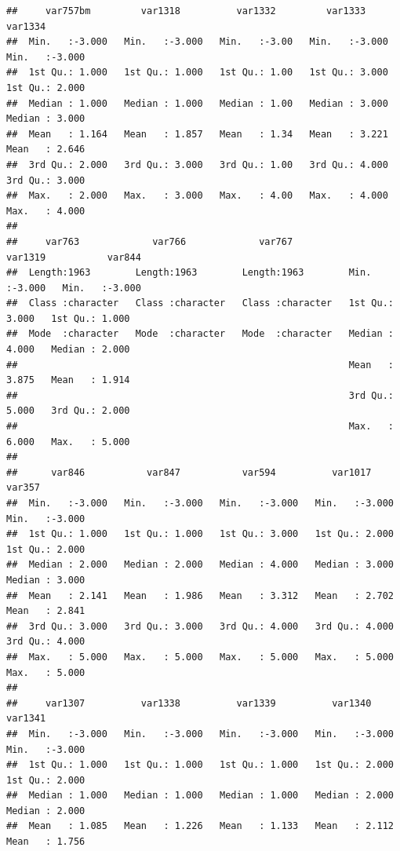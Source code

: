 \documentclass[
]{book}
\begin{document}
\begin{verbatim}
##     var757bm         var1318          var1332         var1333          var1334      
##  Min.   :-3.000   Min.   :-3.000   Min.   :-3.00   Min.   :-3.000   Min.   :-3.000  
##  1st Qu.: 1.000   1st Qu.: 1.000   1st Qu.: 1.00   1st Qu.: 3.000   1st Qu.: 2.000  
##  Median : 1.000   Median : 1.000   Median : 1.00   Median : 3.000   Median : 3.000  
##  Mean   : 1.164   Mean   : 1.857   Mean   : 1.34   Mean   : 3.221   Mean   : 2.646  
##  3rd Qu.: 2.000   3rd Qu.: 3.000   3rd Qu.: 1.00   3rd Qu.: 4.000   3rd Qu.: 3.000  
##  Max.   : 2.000   Max.   : 3.000   Max.   : 4.00   Max.   : 4.000   Max.   : 4.000  
##                                                                                     
##     var763             var766             var767             var1319           var844      
##  Length:1963        Length:1963        Length:1963        Min.   :-3.000   Min.   :-3.000  
##  Class :character   Class :character   Class :character   1st Qu.: 3.000   1st Qu.: 1.000  
##  Mode  :character   Mode  :character   Mode  :character   Median : 4.000   Median : 2.000  
##                                                           Mean   : 3.875   Mean   : 1.914  
##                                                           3rd Qu.: 5.000   3rd Qu.: 2.000  
##                                                           Max.   : 6.000   Max.   : 5.000  
##                                                                                            
##      var846           var847           var594          var1017           var357      
##  Min.   :-3.000   Min.   :-3.000   Min.   :-3.000   Min.   :-3.000   Min.   :-3.000  
##  1st Qu.: 1.000   1st Qu.: 1.000   1st Qu.: 3.000   1st Qu.: 2.000   1st Qu.: 2.000  
##  Median : 2.000   Median : 2.000   Median : 4.000   Median : 3.000   Median : 3.000  
##  Mean   : 2.141   Mean   : 1.986   Mean   : 3.312   Mean   : 2.702   Mean   : 2.841  
##  3rd Qu.: 3.000   3rd Qu.: 3.000   3rd Qu.: 4.000   3rd Qu.: 4.000   3rd Qu.: 4.000  
##  Max.   : 5.000   Max.   : 5.000   Max.   : 5.000   Max.   : 5.000   Max.   : 5.000  
##                                                                                      
##     var1307          var1338          var1339          var1340          var1341      
##  Min.   :-3.000   Min.   :-3.000   Min.   :-3.000   Min.   :-3.000   Min.   :-3.000  
##  1st Qu.: 1.000   1st Qu.: 1.000   1st Qu.: 1.000   1st Qu.: 2.000   1st Qu.: 2.000  
##  Median : 1.000   Median : 1.000   Median : 1.000   Median : 2.000   Median : 2.000  
##  Mean   : 1.085   Mean   : 1.226   Mean   : 1.133   Mean   : 2.112   Mean   : 1.756  

\end{verbatim}
\end{document}
